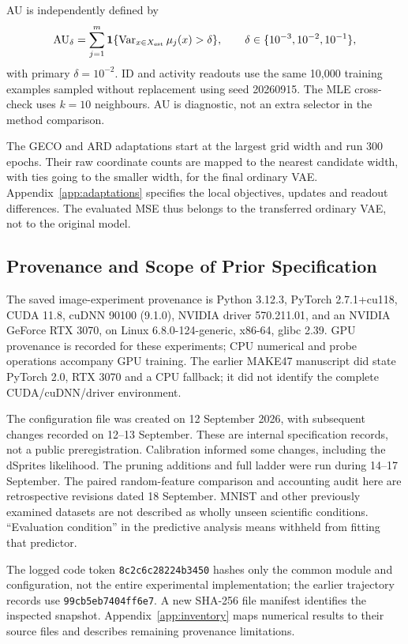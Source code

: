 AU is independently defined by
\begin{equation}
 \mathrm{AU}_\delta=\sum_{j=1}^{m}
 \mathbf1\{\operatorname{Var}_{x\in X_{\rm est}}\mu_j(x)>\delta\},
 \qquad \delta\in\{10^{-3},10^{-2},10^{-1}\},
 \label{eq:au}
\end{equation}
with primary $\delta=10^{-2}$. ID and activity readouts use the same
10,000 training examples sampled without replacement using seed
20260915. The MLE cross-check uses $k=10$ neighbours. AU is diagnostic,
not an extra selector in the method comparison.

The GECO and ARD adaptations start at the largest grid width and run
300 epochs. Their raw coordinate counts are mapped to the nearest
candidate width, with ties going to the smaller width, for the final
ordinary VAE. Appendix~\ref{app:adaptations} specifies the local
objectives, updates and readout differences. The evaluated MSE thus
belongs to the transferred ordinary VAE, not to the original model.

\subsection{Provenance and Scope of Prior Specification}\label{sec:provenance}
The saved image-experiment provenance is Python 3.12.3, PyTorch
2.7.1+cu118, CUDA 11.8, cuDNN 90100 (9.1.0), NVIDIA driver 570.211.01,
and an NVIDIA GeForce RTX 3070, on Linux 6.8.0-124-generic, x86-64,
glibc 2.39. GPU provenance is recorded for these experiments; CPU
numerical and probe operations accompany GPU training. The earlier
MAKE47 manuscript did state PyTorch 2.0, RTX 3070 and a CPU fallback;
it did not identify the complete CUDA/cuDNN/driver environment.

The configuration file was created on 12 September 2026, with subsequent
changes recorded on 12--13 September. These are internal specification
records, not a public preregistration. Calibration informed some changes,
including the dSprites likelihood. The pruning additions and full ladder
were run during 14--17 September. The paired random-feature comparison
and accounting audit here are retrospective revisions dated 18 September.
MNIST and other previously examined datasets are not described as wholly
unseen scientific conditions. ``Evaluation condition'' in the predictive
analysis means withheld from fitting that predictor.

The logged code token \texttt{8c2c6c28224b3450} hashes only the common
module and configuration, not the entire experimental implementation;
the earlier trajectory records use \texttt{99cb5eb7404ff6e7}.
A new SHA-256 file manifest identifies the inspected snapshot.
Appendix~\ref{app:inventory} maps numerical results to their source files
and describes remaining provenance limitations.

